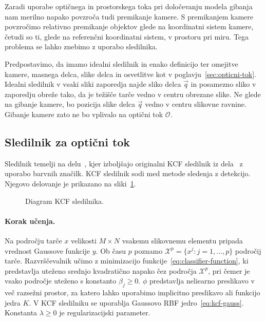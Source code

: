 Zaradi uporabe optičnega in prostorskega toka pri določevanju modela gibanja nam merilno napako povzroča tudi premikanje kamere. S premikanjem kamere povzročimo relativno premikanje objektov glede na koordinatni sistem kamere, četudi so ti, glede na referenčni koordinatni sistem, v prostoru pri miru. Tega problema se lahko znebimo z uporabo sledilnika. 

Predpostavimo, da imamo idealni sledilnik in enako definicijo ter omejitve kamere, masnega delca, slike delca in osvetlitve kot v poglavju~\ref{sec:opticni-tok}. Idealni sledilnik v vsaki sliki zaporedja najde sliko delca $\vec{q}$ in posamezno sliko v zaporedju obreže tako, da je težišče tarče vedno v centru obrezane slike. Ne glede na gibanje kamere, bo pozicija slike delca $\vec{q}$ vedno v centru slikovne ravnine. Gibanje kamere zato ne bo vplivalo na optični tok $\mathcal{O}$.



\subsection{Sledilnik za optični tok} 
Sledilnik temelji na delu~\cite{danelljan2014adaptive}, kjer izboljšajo originalni KCF sledilnik iz dela~\cite{henriques2012exploiting} z uporabo barvnih značilk. KCF sledilnik sodi med metode sledenja z detekcijo. Njegovo delovanje je prikazano na sliki~\ref{fig:diagram-kcf}.

\begin{figure}[htb]
	\centering
	\resizebox{\columnwidth}{!}{}
	\caption[Diagram KCF sledilnika]{Diagram KCF sledilnika.}
	\label{fig:diagram-kcf}
\end{figure}


\paragraph{Korak učenja.}
Na področju tarče $x$ velikosti $M \times N$ vsakemu slikovnemu elementu pripada vrednost Gaussove funkcije $y$. Ob času $p$ poznamo \hbox{$\mathcal{X}^p = \{x^j: j=1,\ldots,p\}$} področij tarče. Razvrščevalnik učimo z minimizacijo funkcije~\eqref{eq:classifier-function}, ki predstavlja uteženo srednjo kvadratično napako čez področja $\mathcal{X}^p$, pri čemer je vsako področje uteženo s konstanto $\beta_j \geq 0$. $\phi$ predstavlja neliearno preslikavo v več razsežni prostor, za katero lahko uporabimo implicitno preslikavo ali funkcijo jedra $K$. V KCF sledilniku se uporablja Gaussovo RBF jedro~\eqref{eq:kcf-gauss}. Konstanta $\lambda \geq 0$ je regularizacijski parameter.

